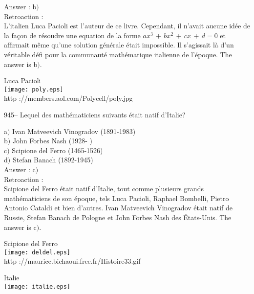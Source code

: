 ﻿\documentclass[letterpaper, 12pt]{article}
\begin{document}
Answer : b$)$\\

Retroaction : \\
L'italien Luca Pacioli est l'auteur de ce livre. Cependant, il
n'avait aucune id\'ee de la fa\c con de r\'esoudre une equation de
la forme $ax^3\,+\,bx^2\,+\,cx\,+\,d=0$ et affirmait m\^eme qu'une
solution g\'en\'erale \'etait impossible. Il s'agissait l\`a d'un
v\'eritable d\'efi pour la communaut\'e math\'ematique italienne de
l'\'epoque. The answer is b$)$.\\

        \begin{center}
        Luca Pacioli\\
    \texttt{[image: poly.eps]}\\
        {\footnotesize http ://members.aol.com/Polycell/poly.jpg}
    \end{center}

945-- Lequel des math\'ematiciens suivants \'etait natif d'Italie?

a$)$ Ivan Matveevich Vinogradov (1891-1983)\\
b$)$ John Forbes Nash (1928- ) \\
c$)$ Scipione del Ferro (1465-1526) \\
d$)$ Stefan Banach (1892-1945) \\

Answer : c$)$\\

Retroaction :\\
Scipione del Ferro \'etait natif d'Italie, tout comme plusieurs
grands math\'ematiciens de son \'epoque, tels Luca Pacioli, Raphael
Bombelli, Pietro Antonio Cataldi et bien d'autres. Ivan Matveevich
Vinogradov
\'etait natif de Russie, Stefan Banach de Pologne et John Forbes Nash des
\'Etats-Unis. The answer is c$)$.\\

        \begin{center}
        Scipione del Ferro\\
    \texttt{[image: deldel.eps]}\\
        {\footnotesize http ://maurice.bichaoui.free.fr/Histoire33.gif}
    \end{center}

        \begin{center}
        Italie\\
    \texttt{[image: italie.eps]}\\
    \end{center}
\end{document}
